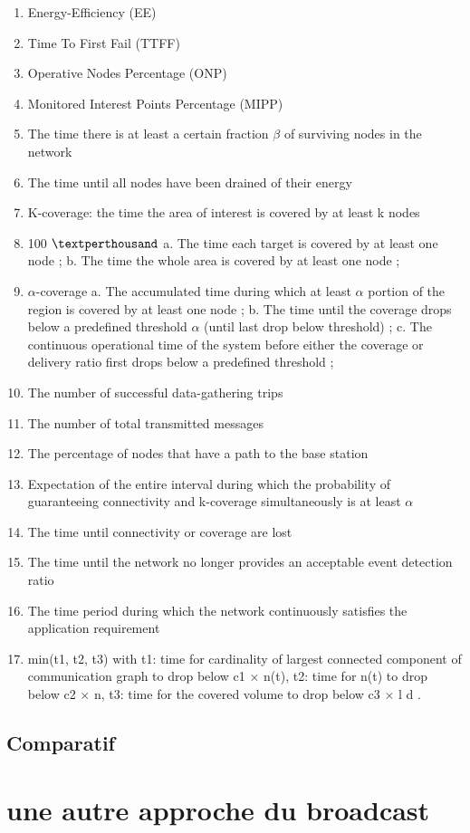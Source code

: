 \begin{enumerate}
 
\item Energy-Efficiency (EE)
\item Time To First Fail (TTFF)
\item Operative Nodes Percentage (ONP)
\item Monitored Interest Points Percentage (MIPP)
\item The time there is at least a certain fraction $\beta$ of surviving nodes in the network 
\item The time until all nodes have been drained of their energy 
\item K-coverage: the time the area of interest is covered by at least k nodes 
\item 100 $\textperthousand$
a. The time each target is covered by at least one node  ;
b. The time the whole area is covered by at least one node  ;

\item$\alpha$-coverage
a. The accumulated time during which at least $\alpha$ portion of the region is covered by
at least one node ;
b. The time until the coverage drops below a predefined threshold $\alpha$ (until last drop
below threshold)  ;
c. The continuous operational time of the system before either the coverage or
delivery ratio first drops below a predefined threshold ;

\item The number of successful data-gathering trips
\item The number of total transmitted messages 
\item The percentage of nodes that have a path to the base station
\item Expectation of the entire interval during which the probability of guaranteeing connectivity and k-coverage simultaneously is at least $\alpha$
\item The time until connectivity or coverage are lost
\item The time until the network no longer provides an acceptable event detection ratio
\item The time period during which the network continuously satisfies the application requirement
\item min(t1, t2, t3)
with t1: time for cardinality of largest connected component of
communication graph to drop below c1 $\times$ n(t), t2: time for n(t) to drop below c2 $\times$ n, t3:
time for the covered volume to drop below c3 $\times$ l d .
\end{enumerate}

\subsection{Comparatif}

\section{une autre approche du broadcast}











